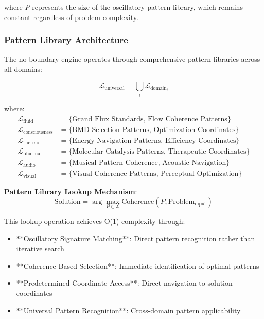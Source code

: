 \documentclass[11pt,a4paper]{article}
\theoremstyle{remark}
\begin{document}
where $P$ represents the size of the oscillatory pattern library, which remains constant regardless of problem complexity.

\subsubsection{Pattern Library Architecture}

The no-boundary engine operates through comprehensive pattern libraries across all domains:

\begin{equation}
\mathcal{L}_{\text{universal}} = \bigcup_{i} \mathcal{L}_{\text{domain}_i}
\end{equation}

where:
\begin{align}
\mathcal{L}_{\text{fluid}} &= \{\text{Grand Flux Standards, Flow Coherence Patterns}\} \\
\mathcal{L}_{\text{consciousness}} &= \{\text{BMD Selection Patterns, Optimization Coordinates}\} \\
\mathcal{L}_{\text{thermo}} &= \{\text{Energy Navigation Patterns, Efficiency Coordinates}\} \\
\mathcal{L}_{\text{pharma}} &= \{\text{Molecular Catalysis Patterns, Therapeutic Coordinates}\} \\
\mathcal{L}_{\text{audio}} &= \{\text{Musical Pattern Coherence, Acoustic Navigation}\} \\
\mathcal{L}_{\text{visual}} &= \{\text{Visual Coherence Patterns, Perceptual Optimization}\}
\end{align}

\textbf{Pattern Library Lookup Mechanism}:
\begin{equation}
\text{Solution} = \arg\max_{P \in \mathcal{L}} \text{Coherence}(P, \text{Problem}_{\text{input}})
\end{equation}

This lookup operation achieves O(1) complexity through:
\begin{itemize}
\item **Oscillatory Signature Matching**: Direct pattern recognition rather than iterative search
\item **Coherence-Based Selection**: Immediate identification of optimal patterns
\item **Predetermined Coordinate Access**: Direct navigation to solution coordinates
\item **Universal Pattern Recognition**: Cross-domain pattern applicability
\end{itemize}
\end{document}
